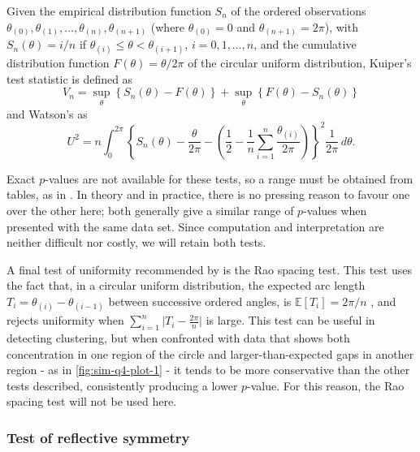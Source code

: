 \documentclass[../../ArchStats.tex]{subfiles}
\begin{document}
Given the empirical distribution function $S_n$ of the ordered observations $\theta_{(0)}, \theta_{(1)}, \dots, \theta_{(n)}, \theta_{(n+1)}$ (where $\theta_{(0)} = 0$ and $\theta_{(n+1)} = 2\pi$), with $S_n(\theta) = i/n$ if $\theta_{(i)} \leq \theta < \theta_{(i+1)}$, $i = 0,1,\dots, n$, and the cumulative distribution function $F(\theta) = \theta/2\pi$ of the circular uniform distribution, Kuiper's test statistic is defined as
\begin{equation}
V_n = \sup_\theta \left\lbrace S_n(\theta) - F(\theta) \right\rbrace + 
\sup_\theta \left\lbrace F(\theta) - S_n(\theta) \right\rbrace 
\end{equation}
and Watson's as
\begin{equation}
U^2 = n \int_0^{2\pi} \left\lbrace S_n(\theta) - \frac{\theta}{2\pi} - \left(\frac{1}{2} - \frac{1}{n} \sum_{i=1}^n \frac{\theta_{(i)}}{2\pi} \right) \right\rbrace^2 \frac{1}{2\pi}\, d\theta.
\end{equation}

Exact $p$-values are not available for these tests, so a range must be obtained from tables, as in \cite{Mardia1999}. In theory and in practice, there is no pressing reason to favour one over the other here; both generally give a similar range of $p$-values when presented with the same data set. Since computation and interpretation are neither difficult nor costly, we will retain both tests.

A final test of uniformity recommended by \cite{Pewsey2014} is the Rao spacing test. This test uses the fact that, in a circular uniform distribution, the expected arc length $T_i = \theta_{(i)} - \theta_{(i-1)}$ between successive ordered angles, is 
$\mathbb{E}\left[T_i\right] = 2\pi/n$ , and rejects uniformity when $\sum_{i=1}^n \vert T_i - \frac{2\pi}{n}\vert$ is large. This test can be useful in detecting clustering, but when confronted with data that shows both concentration in one region of the circle and larger-than-expected gaps in another region - as in \ref{fig:sim-q4-plot-1} - it tends to be more conservative than the other tests described, consistently producing a lower $p$-value. For this reason, the Rao spacing test will not be used here.


\subsubsection{Test of reflective symmetry}
\label{sec:refl-symmetry}
\end{document}
